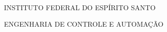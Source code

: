 {
    \center
    {\MakeUppercase{Instituto Federal do Espírito Santo}}
    \par
    \vspace{0.5cm}
    {\MakeUppercase{Engenharia de Controle e Automação}}
    \par
    \vfill
    {\MakeUppercase\imprimirautor}\par
    \vfill
    {\bfseries\MakeUppercase\imprimirtitulo}\par
    \vfill
         
    \vfill
    {\MakeUppercase\imprimirlocal}\par
    {\imprimirdata}\par
}
